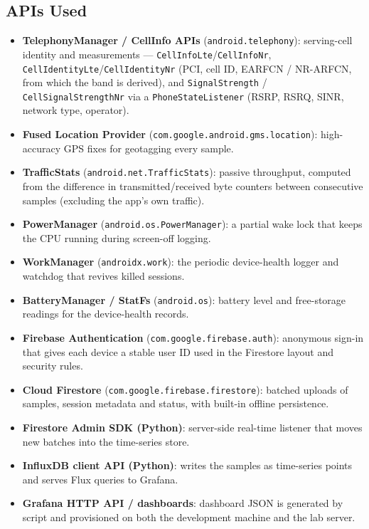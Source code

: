 \subsection{APIs Used}
\begin{itemize}
  \item \textbf{TelephonyManager / CellInfo APIs}
        (\texttt{android.telephony}): serving-cell identity and measurements
        --- \texttt{CellInfoLte}/\texttt{CellInfoNr},
        \texttt{CellIdentityLte}/\texttt{CellIdentityNr} (PCI, cell ID, EARFCN
        / NR-ARFCN, from which the band is derived), and
        \texttt{SignalStrength} / \texttt{CellSignalStrengthNr} via a
        \texttt{PhoneStateListener} (RSRP, RSRQ, SINR, network type,
        operator).
  \item \textbf{Fused Location Provider}
        (\texttt{com.google.android.gms.location}): high-accuracy GPS fixes
        for geotagging every sample.
  \item \textbf{TrafficStats} (\texttt{android.net.TrafficStats}): passive
        throughput, computed from the difference in transmitted/received byte
        counters between consecutive samples (excluding the app's own
        traffic).
  \item \textbf{PowerManager} (\texttt{android.os.PowerManager}): a partial
        wake lock that keeps the CPU running during screen-off logging.
  \item \textbf{WorkManager} (\texttt{androidx.work}): the periodic
        device-health logger and watchdog that revives killed sessions.
  \item \textbf{BatteryManager / StatFs} (\texttt{android.os}): battery level
        and free-storage readings for the device-health records.
  \item \textbf{Firebase Authentication}
        (\texttt{com.google.firebase.auth}): anonymous sign-in that gives each
        device a stable user ID used in the Firestore layout and security
        rules.
  \item \textbf{Cloud Firestore} (\texttt{com.google.firebase.firestore}):
        batched uploads of samples, session metadata and status, with
        built-in offline persistence.
  \item \textbf{Firestore Admin SDK (Python)}: server-side real-time listener
        that moves new batches into the time-series store.
  \item \textbf{InfluxDB client API (Python)}: writes the samples as
        time-series points and serves Flux queries to Grafana.
  \item \textbf{Grafana HTTP API / dashboards}: dashboard JSON is generated by
        script and provisioned on both the development machine and the lab
        server.
\end{itemize}
